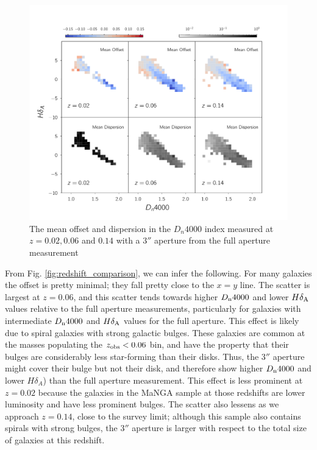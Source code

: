 \begin{figure}
\includegraphics[width=\textwidth]{figures/dn4000_full_aperture_comparisons.pdf}
\caption[The mean offset and dispersion in the $D_{n}4000$ index measured 
at $z = 0.02,0.06$ and $0.14$ with a $3''$ aperture from the full aperture measurement]{ The mean offset and dispersion in the $D_{n}4000$ index measured at $z = 0.02,0.06$ and $0.14$ with a $3''$ aperture from the full aperture measurement
\label{fig:offset_d4000}}
\end{figure}

From Fig. \ref{fig:redshift_comparison}, we can infer the following. For 
many galaxies the offset is pretty minimal; they fall pretty close 
to the $x=y$ line. The scatter is largest at $z = 0.06$, and this scatter
tends towards higher $D_{\rm n}4000$ and lower $H\delta_{\rm A}$ values 
relative to the full aperture measurements, particularly for galaxies with
intermediate $D_{\rm n}4000$ and $H\delta_{\rm A}$ values for the full
aperture. This effect is likely due to spiral galaxies with strong galactic
bulges. These galaxies are common at the masses populating the $z_{\rm obs} < 0.06$
bin, and have the property that their bulges are considerably less star-forming
than their disks. Thus, the 3$''$ aperture might cover their bulge but not their
disk, and therefore show higher $D_{\rm n} 4000$ and lower $H\delta_{A}$) than
the full aperture measurement. This effect is less prominent at $z=0.02$ because
the galaxies in the MaNGA sample at those redshifts are lower luminosity and 
have less prominent bulges. The scatter also lessens as we approach $z = 0.14$, 
close to the survey limit; although this sample also contains spirals with
strong bulges,  the 3$''$ aperture is larger with respect to the total size
of galaxies at this redshift.\\

